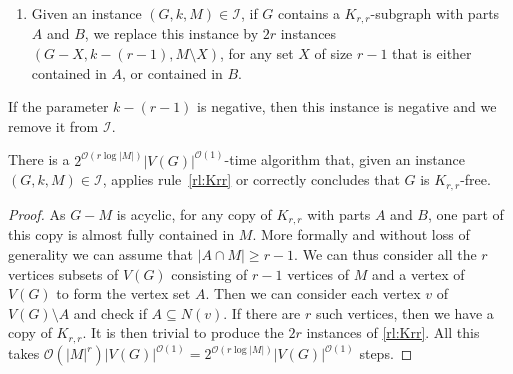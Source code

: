 \documentclass{amsart}
\newcommand{\BR}[1]{BR$_ #1$}
\newcommand{\I}{\mathcal{I}}
\newcommand{\ruleref}[1]{\hyperref[#1]{\ref*{#1}}}
\renewcommand{\O}{\mathcal{O}}
\begin{document}
\begin{enumerate}[label=(\BR{{\arabic*}})]
\setcounter{enumi}{0}
\item \label{rl:Krr} Given an instance $(G, k, M)\in \I$, if $G$ contains a $K_{r,r}$-subgraph with parts $A$ and $B$, we replace this instance by $2r$ instances $(G -  X, k-(r-1), M\setminus X)$, for any set $X$ of size $r-1$ that is either contained in $A$, or contained in $B$.
\end{enumerate}
\begin{remark}
  If the parameter $k-(r-1)$ is negative, then this instance is negative and we remove it from $\I$.
\end{remark}
\begin{lemma}\label{lem:findkrr}
   There is a  $2^{\O\left (r\log |M| \right )}|V(G)|^{\O(1)}$-time algorithm that, given an instance $(G, k, M)\in \I$, applies rule~\ruleref{rl:Krr} or correctly concludes that $G$ is $K_{r,r}$-free.
\end{lemma}
\begin{proof}
    As $G-M$ is acyclic, for any copy of $K_{r,r}$ with parts $A$ and $B$, one part of this copy is almost fully contained in $M$. More formally and without loss of generality we can assume that $|A\cap M|\ge r-1$.
    We can thus consider all the $r$ vertices subsets of $V(G)$ consisting of $r-1$ vertices of $M$ and a vertex of $V(G)$ to form the vertex set $A$. Then we can consider each vertex $v$ of $V(G)\setminus A$ and check if $A\subseteq N(v)$. If there are $r$ such vertices, then we have a copy of $K_{r,r}$. It is then trivial to produce the $2r$ instances of \ruleref{rl:Krr}. All this takes $\O(|M|^r)|V(G)|^{\O(1)}=2^{\O(r\log |M|)}|V(G)|^{\O(1)}$ steps.
\end{proof}
\end{document}
